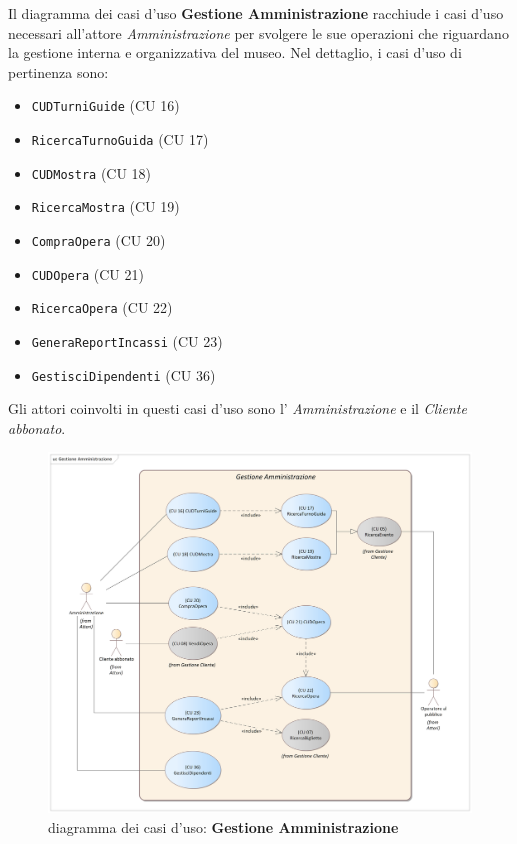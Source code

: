 \documentclass{article}
\begin{document}
\indent\indent Il diagramma dei casi d'uso \textbf{Gestione Amministrazione} racchiude i casi d'uso necessari all'attore \emph{Amministrazione} per svolgere le sue operazioni che riguardano la gestione interna e organizzativa del museo. Nel dettaglio, i casi d'uso di pertinenza sono:
\medskip
\begin{itemize}[itemsep=4pt]
  \item \texttt{CUDTurniGuide} (CU 16)
  \item \texttt{RicercaTurnoGuida} (CU 17)
  \item \texttt{CUDMostra} (CU 18)
  \item \texttt{RicercaMostra} (CU 19)
  \item \texttt{CompraOpera} (CU 20)
  \item \texttt{CUDOpera} (CU 21)
  \item \texttt{RicercaOpera} (CU 22)
  \item \texttt{GeneraReportIncassi} (CU 23)
  \item \texttt{GestisciDipendenti} (CU 36)
\end{itemize}
\medskip
Gli attori coinvolti in questi casi d'uso sono l' \emph{Amministrazione} e il \emph{Cliente abbonato}.

\begin{figure}[h]
    \centering
    \includegraphics[width=1\textwidth]{Gestione Amministrazione}
    \caption{diagramma dei casi d'uso: \textbf{Gestione Amministrazione}}
    \label{fig:GestioneAmministrazione}
\end{figure}
\end{document}
